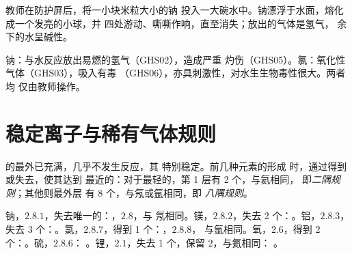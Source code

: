 \begin{inthelab}[钠与水]
教师在防护屏后，将一小块米粒大小的钠
投入一大碗水中。钠漂浮于水面，熔化成一个发亮的小球，并
四处游动、嘶嘶作响，直至消失；放出的气体是氢气，
余下的水呈碱性。
\end{inthelab}

\begin{safety}{\quad{}}
钠：与水反应放出易燃的氢气（GHS02），造成严重
灼伤（GHS05）。氯：氧化性气体（GHS03），吸入有毒
（GHS06），亦具刺激性，对水生生物毒性很大。两者均
仅由教师操作。
\end{safety}

\section{稳定离子与稀有气体规则}

\begin{definition}[二隅规则与八隅规则]\label{def:g10:electron-shells:octet}
的最外已充满，几乎不发生反应，其
特别稳定。前几种元素的形成
时，通过得到或失去，使其达到
最近的：对于最轻的，第 1 层有 2 个，与氦相同，
即\emph{二隅规则}；其他则最外层
有 8 个，与氖或氩相同，即
\emph{八隅规则}。
\end{definition}

\begin{example}[规则预测的离子]\label{ex:g10:electron-shells:ions}
钠，$2.8.1$，失去唯一的：，$2.8$，与
氖相同。镁，$2.8.2$，失去 2 个：。铝，$2.8.3$，
失去 3 个：。氯，$2.8.7$，得到 1 个：，$2.8.8$，
与氩相同。氧，$2.6$，得到 2 个：。硫，$2.8.6$：
。锂，$2.1$，失去 1 个，保留 $2$，与氦相同：
。
\end{example}

